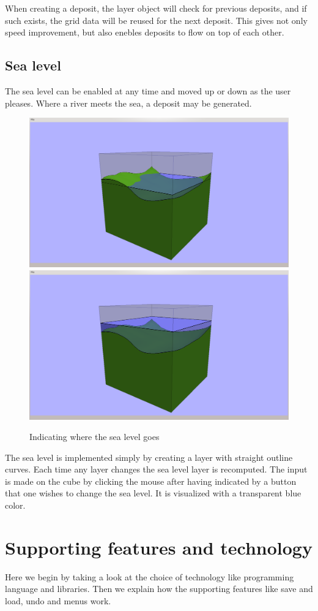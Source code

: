 \documentclass[a4paper,12pt]{report}
\begin{document}
When creating a deposit, the layer object will check for previous deposits, and if such exists, the grid data will be reused for the next deposit. This gives not only speed improvement, but also enebles deposits to flow on top of each other.

\subsection{Sea level}
The sea level can be enabled at any time and moved up or down as the user pleases. Where a river meets the sea, a deposit may be generated.

\begin{figure}
\includegraphics[trim = 90mm 7mm 80mm 30mm, clip,width=.5\linewidth]{thesis/results/seaEnabled.png}
\includegraphics[trim = 90mm 7mm 80mm 30mm, clip,width=.5\linewidth]{thesis/results/seaChanged.png}
 \caption{Indicating where the sea level goes}
 \label{fig:seaLevel}
\end{figure}

The sea level is implemented simply by creating a layer with straight outline curves. Each time any layer changes the sea level layer is recomputed. The input is made on the cube by clicking the mouse after having indicated by a button that one wishes to change the sea level. It is visualized with a transparent blue color.

\section{Supporting features and technology}
\label{sec:tech}
Here we begin by taking a look at the choice of technology like programming language and libraries. Then we explain how the supporting features like save and load, undo and menus work.
\end{document}

